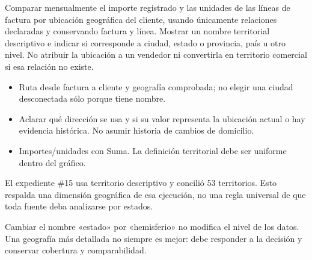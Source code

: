 \label{wwi06}
\begin{goal}
Comparar mensualmente el importe registrado y las unidades de las líneas de factura por ubicación geográfica del cliente, usando únicamente relaciones declaradas y conservando factura y línea. Mostrar un nombre territorial descriptivo e indicar si corresponde a ciudad, estado o provincia, país u otro nivel. No atribuir la ubicación a un vendedor ni convertirla en territorio comercial si esa relación no existe.
\end{goal}
\begin{itemize}
\item Ruta desde factura a cliente y geografía comprobada; no elegir una ciudad desconectada sólo porque tiene nombre.
\item Aclarar qué dirección se usa y si su valor representa la ubicación actual o hay evidencia histórica. No asumir historia de cambios de domicilio.
\item Importes/unidades con Suma. La definición territorial debe ser uniforme dentro del gráfico.
\end{itemize}
\begin{good}
El expediente \#15 usa territorio descriptivo  y concilió 53 territorios. Esto respalda una dimensión geográfica de esa ejecución, no una regla universal de que toda fuente deba analizarse por estados.
\end{good}
\begin{note}
Cambiar el nombre «estado» por «hemisferio» no modifica el nivel de los datos. Una geografía más detallada no siempre es mejor: debe responder a la decisión y conservar cobertura y comparabilidad.
\end{note}
